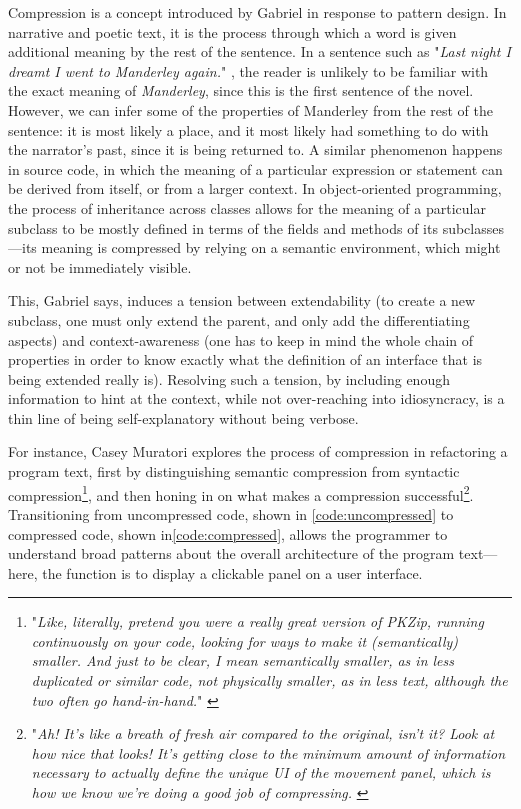 Compression is a concept introduced by Gabriel in response to pattern design. In narrative and poetic text, it is the process through which a word is given additional meaning by the rest of the sentence. In a sentence such as "\emph{Last night I dreamt I went to Manderley again.}" \citep{dumaurier_rebecca_1938}, the reader is unlikely to be familiar with the exact meaning of \emph{Manderley}, since this is the first sentence of the novel. However, we can infer some of the properties of Manderley from the rest of the sentence: it is most likely a place, and it most likely had something to do with the narrator's past, since it is being returned to. A similar phenomenon happens in source code, in which the meaning of a particular expression or statement can be derived from itself, or from a larger context. In object-oriented programming, the process of inheritance across classes allows for the meaning of a particular subclass to be mostly defined in terms of the fields and methods of its subclasses—its meaning is compressed by relying on a semantic environment, which might or not be immediately visible.

This, Gabriel says, induces a tension between extendability (to create a new subclass, one must only extend the parent, and only add the differentiating aspects) and context-awareness (one has to keep in mind the whole chain of properties in order to know exactly what the definition of an interface that is being extended really is). Resolving such a tension, by including enough information to hint at the context, while not over-reaching into idiosyncracy, is a thin line of being self-explanatory without being verbose.

For instance, Casey Muratori explores the process of compression in refactoring a program text, first by distinguishing semantic compression from syntactic compression\footnote{"\emph{Like, literally, pretend you were a really great version of PKZip, running continuously on your code, looking for ways to make it (semantically) smaller. And just to be clear, I mean semantically smaller, as in less duplicated or similar code, not physically smaller, as in less text, although the two often go hand-in-hand.}" \citep{muratori_semantic_2014}}, and then honing in on what makes a compression successful\footnote{"\emph{Ah! It's like a breath of fresh air compared to the original, isn't it? Look at how nice that looks! It's getting close to the minimum amount of information necessary to actually define the unique UI of the movement panel, which is how we know we're doing a good job of compressing.} \citep{muratori_semantic_2014}}. Transitioning from uncompressed code, shown in \ref{code:uncompressed} to compressed code, shown in\ref{code:compressed}, allows the programmer to understand broad patterns about the overall architecture of the program text—here, the function is to display a clickable panel on a user interface.

